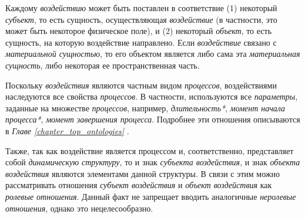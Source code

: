 Каждому \textit{воздействию} может быть поставлен в соответствие (1) некоторый \textit{субъект\scnrolesign}, то есть сущность, осуществляющая \textit{воздействие} (в частности, это может быть некоторое физическое поле), и (2) некоторый \textit{объект\scnrolesign}, то есть сущность, на которую воздействие направлено. Если \textit{воздействие} связано с \textit{материальной сущностью}, то его объектом является либо сама эта \textit{материальная сущность}, либо некоторая ее пространственная часть.

Поскольку \textit{воздействия} являются частным видом \textit{процессов}, воздействиями наследуются все свойства \textit{процессов}. В частности, используются все \textit{параметры}, заданные на множестве \textit{процессов}, например, \textit{длительность*}, \textit{момент начала процесса*}, \textit{момент завершения процесса\scnsupergroupsign}. Подробнее эти отношения описываются в \textit{Главе \ref{chapter_top_ontologies} }.

Также, так как воздействие является процессом и, соответственно, представляет собой \textit{динамическую структуру}, то и знак \textit{субъекта воздействия\scnrolesign}, и знак \textit{объекта воздействия\scnrolesign} являются элементами данной структуры. В связи с этим можно рассматривать отношения \textit{субъект воздействия\scnrolesign} и \textit{объект воздействия\scnrolesign} как \textit{ролевые отношения}. Данный факт не запрещает вводить аналогичные \textit{неролевые отношения}, однако это нецелесообразно.

